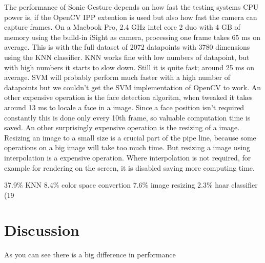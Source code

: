 The performance of Sonic Gesture depends on how fast the testing systems CPU power is, if the OpenCV IPP extention is used but also how fast the camera can capture frames. On a Macbook Pro, 2.4 GHz intel core 2 duo with 4 GB of memory using the build-in iSight as camera, processing one frame takes 65 ms on average. This is with the full dataset of 2072 datapoints with 3780 dimensions using the KNN classifier. KNN works fine with low numbers of datapoint, but with high numbers it starts to slow down. Still it is quite fast; around 25 ms on average. SVM will probably perform much faster with a high number of datapoints but we couldn't get the SVM implementation of OpenCV to work. An other expensive operation is the face detection algoritm, when tweaked it takes around 13 ms to locale a face in a image. Since a face position isn't required constantly this is done only every 10th frame, so valuable computation time is saved. An other surprisingly expensive operation is the resizing of a image. Resizing an image to a small size is a crucial part of the pipe line, because some operations on a big image will take too much time. But resizing a image using interpolation is a expensive operation. Where interpolation is not required, for example for rendering on the screen, it is disabled saving more computing time. 

37.9\% KNN
8.4\% color space convertion
7.6\% image resizing
2.3\% haar classifier (19%

\section{Discussion}
As you can see there is a big difference in performance



